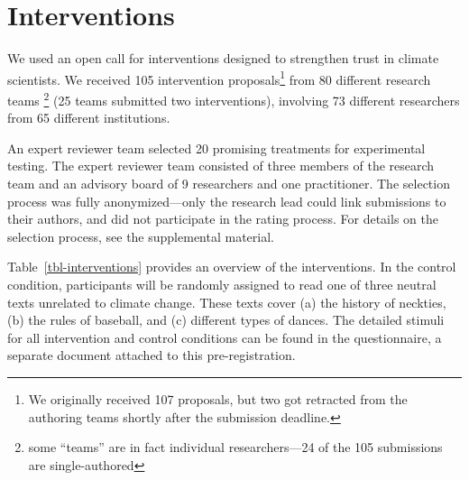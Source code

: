 \documentclass[
  letterpaper,
  DIV=11,
  numbers=noendperiod]{scrartcl}
\begin{document}
\section{Interventions}\label{interventions}

We used an open call for interventions designed to strengthen trust in
climate scientists. We received 105 intervention proposals\footnote{We
  originally received 107 proposals, but two got retracted from the
  authoring teams shortly after the submission deadline.} from 80
different research teams \footnote{some ``teams'' are in fact individual
  researchers---24 of the 105 submissions are single-authored} (25 teams
submitted two interventions), involving 73 different researchers from 65
different institutions.

An expert reviewer team selected 20 promising treatments for
experimental testing. The expert reviewer team consisted of three
members of the research team and an advisory board of 9 researchers and
one practitioner. The selection process was fully anonymized---only the
research lead could link submissions to their authors, and did not
participate in the rating process. For details on the selection process,
see the supplemental material.

Table~\ref{tbl-interventions} provides an overview of the interventions.
In the control condition, participants will be randomly assigned to read
one of three neutral texts unrelated to climate change. These texts
cover (a) the history of neckties, (b) the rules of baseball, and (c)
different types of dances. The detailed stimuli for all intervention and
control conditions can be found in the questionnaire, a separate
document attached to this pre-registration.
\end{document}
